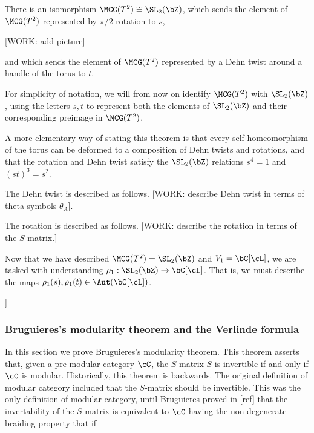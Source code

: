 \begin{thrm} There is an isomorphism $\MCG(T^2)\cong \SL_2(\bZ)$, which sends the element of $\MCG(T^2)$ represented by $\pi/2$-rotation to $s$,

[WORK: add picture]

and which sends the element of $\MCG(T^2)$ represented by a Dehn twist around a handle of the torus to $t$. 
\end{thrm}
\begin{rem} For simplicity of notation, we will from now on identify $\MCG(T^2)$ with $\SL_2(\bZ)$, using the letters $s,t$ to represent both the elements of $\SL_2(\bZ)$ and their corresponding preimage in $\MCG(T^2)$.

A more elementary way of stating this theorem is that every self-homeomorphism of the torus can be deformed to a composition of Dehn twists and rotations, and that the rotation and Dehn twist satisfy the $\SL_2(\bZ)$ relations $s^4=1$ and $(st)^3=s^2$.

The Dehn twist is described as follows. [WORK: describe Dehn twist in terms of theta-symbols $\theta_{A}$].

The rotation is described as follows. [WORK: describe the rotation in terms of the $S$-matrix.]



\end{rem}

Now that we have described $\MCG(T^2)=\SL_2(\bZ)$ and $V_1=\bC[\cL]$, we are tasked with understanding $\rho_1:\SL_2(\bZ)\to \bC[\cL]$. That is, we must describe the maps $\rho_1(s),\rho_1(t)\in \Aut(\bC[\cL])$.


]

\subsubsection{Bruguieres's modularity theorem and the Verlinde formula}

In this section we prove Bruguieres's modularity theorem. This theorem asserts that, given a pre-modular category $\cC$, the $S$-matrix $S$ is invertible if and only if $\cC$ is modular. Historically, this theorem is backwards. The original definition of modular category included that the $S$-matrix should be invertible. This was the only definition of modular category, until Bruguieres proved in [ref] that the invertability of the $S$-matrix is equivalent to $\cC$ having the non-degenerate braiding property that if


